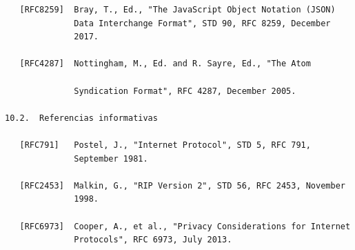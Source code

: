 \begin{Verbatim}
   [RFC8259]  Bray, T., Ed., "The JavaScript Object Notation (JSON)
              Data Interchange Format", STD 90, RFC 8259, December
              2017.

   [RFC4287]  Nottingham, M., Ed. and R. Sayre, Ed., "The Atom

              Syndication Format", RFC 4287, December 2005.

10.2.  Referencias informativas

   [RFC791]   Postel, J., "Internet Protocol", STD 5, RFC 791,
              September 1981.

   [RFC2453]  Malkin, G., "RIP Version 2", STD 56, RFC 2453, November
              1998.

   [RFC6973]  Cooper, A., et al., "Privacy Considerations for Internet
              Protocols", RFC 6973, July 2013.
\end{Verbatim}
\newpage
